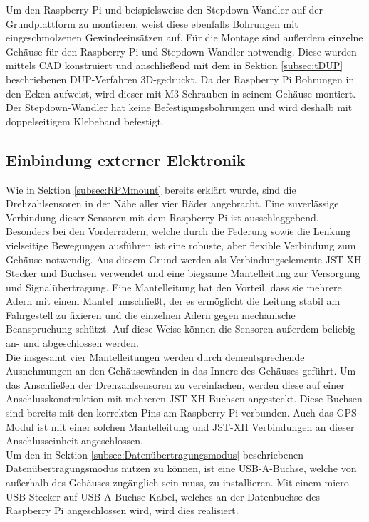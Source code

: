 Um den Raspberry Pi und beispielsweise den Stepdown-Wandler auf der Grundplattform zu montieren, weist diese ebenfalls Bohrungen mit eingeschmolzenen Gewindeeinsätzen auf. Für die Montage sind außerdem einzelne Gehäuse für den Raspberry Pi und Stepdown-Wandler notwendig. Diese wurden mittels \ac{CAD} konstruiert und anschließend mit dem in Sektion \ref{subsec:tDUP} beschriebenen \ac{DUP}-Verfahren 3D-gedruckt. Da der Raspberry Pi Bohrungen in den Ecken aufweist, wird dieser mit M3 Schrauben in seinem Gehäuse montiert. Der Stepdown-Wandler hat keine Befestigungsbohrungen und wird deshalb mit doppelseitigem Klebeband befestigt. 

\subsection{Einbindung externer Elektronik}
\label{subsec:elekExtern}
Wie in Sektion \ref{subsec:RPMmount} bereits erklärt wurde, sind die Drehzahlsensoren in der Nähe aller vier Räder angebracht. Eine zuverlässige Verbindung dieser Sensoren mit dem Raspberry Pi ist ausschlaggebend. Besonders bei den Vorderrädern, welche durch die Federung sowie die Lenkung vielseitige Bewegungen ausführen ist eine robuste, aber flexible Verbindung zum Gehäuse notwendig. Aus diesem Grund werden als Verbindungselemente JST-XH Stecker und Buchsen verwendet und eine biegsame Mantelleitung zur Versorgung und Signalübertragung. Eine Mantelleitung hat den Vorteil, dass sie mehrere Adern mit einem Mantel umschließt, der es ermöglicht die Leitung stabil am Fahrgestell zu fixieren und die einzelnen Adern gegen mechanische Beanspruchung schützt. Auf diese Weise können die Sensoren außerdem beliebig an- und abgeschlossen werden.\\
Die insgesamt vier Mantelleitungen werden durch dementsprechende Ausnehmungen an den Gehäusewänden in das Innere des Gehäuses geführt. Um das Anschließen der Drehzahlsensoren zu vereinfachen, werden diese auf einer Anschlusskonstruktion mit mehreren JST-XH Buchsen angesteckt. Diese Buchsen sind bereits mit den korrekten Pins am Raspberry Pi verbunden. Auch das \ac{GPS}-Modul ist mit einer solchen Mantelleitung und JST-XH Verbindungen an dieser Anschlusseinheit angeschlossen.\\
Um den in Sektion \ref{subsec:Datenübertragungsmodus} beschriebenen Datenübertragungsmodus nutzen zu können, ist eine \ac{USB}-A-Buchse, welche von außerhalb des Gehäuses zugänglich sein muss, zu installieren. Mit einem micro-\ac{USB}-Stecker auf \ac{USB}-A-Buchse Kabel, welches an der Datenbuchse des Raspberry Pi angeschlossen wird, wird dies realisiert.